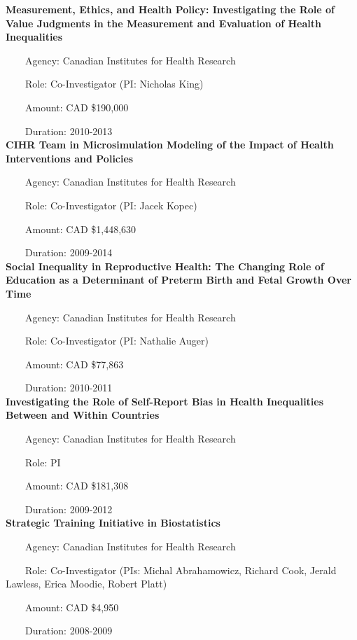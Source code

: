 \documentclass[
  letterpaper,
  DIV=11,
  numbers=noendperiod]{scrartcl}
\begin{document}
\textbf{Measurement, Ethics, and Health Policy: Investigating the Role
of Value Judgments in the Measurement and Evaluation of Health
Inequalities}\\
\strut ~~~~Agency: Canadian Institutes for Health Research\\
\strut ~~~~Role: Co-Investigator (PI: Nicholas King)\\
\strut ~~~~Amount: CAD \$190,000\\
\strut ~~~~Duration: 2010-2013\\

\textbf{CIHR Team in Microsimulation Modeling of the Impact of Health
Interventions and Policies}\\
\strut ~~~~Agency: Canadian Institutes for Health Research\\
\strut ~~~~Role: Co-Investigator (PI: Jacek Kopec)\\
\strut ~~~~Amount: CAD \$1,448,630\\
\strut ~~~~Duration: 2009-2014\\

\textbf{Social Inequality in Reproductive Health: The Changing Role of
Education as a Determinant of Preterm Birth and Fetal Growth Over
Time}\\
\strut ~~~~Agency: Canadian Institutes for Health Research\\
\strut ~~~~Role: Co-Investigator (PI: Nathalie Auger)\\
\strut ~~~~Amount: CAD \$77,863\\
\strut ~~~~Duration: 2010-2011\\

\textbf{Investigating the Role of Self-Report Bias in Health
Inequalities Between and Within Countries}\\
\strut ~~~~Agency: Canadian Institutes for Health Research\\
\strut ~~~~Role: PI\\
\strut ~~~~Amount: CAD \$181,308\\
\strut ~~~~Duration: 2009-2012\\

\textbf{Strategic Training Initiative in Biostatistics}\\
\strut ~~~~Agency: Canadian Institutes for Health Research\\
\strut ~~~~Role: Co-Investigator (PIs: Michal Abrahamowicz, Richard
Cook, Jerald Lawless, Erica Moodie, Robert Platt)\\
\strut ~~~~Amount: CAD \$4,950\\
\strut ~~~~Duration: 2008-2009\\
\end{document}

